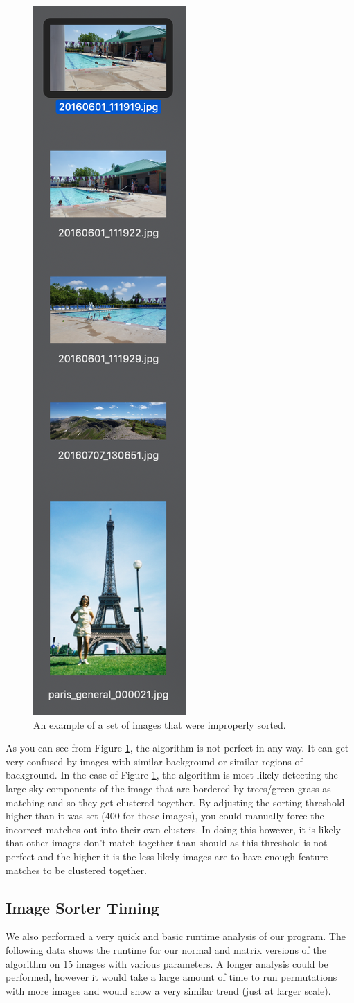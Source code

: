 \documentclass[12pt]{article}
\begin{document}
\begin{figure}[H]
	\centering
	\includegraphics[width=.2\textwidth]{images/wrong_match_1.png}
	\caption{An example of a set of images that were improperly sorted.}
	\label{fig:incorrect_sort}
\end{figure}

	As you can see from Figure \ref{fig:incorrect_sort}, the algorithm is not perfect in any way. It can get very confused by images with similar background or similar regions of background. In the case of Figure \ref{fig:incorrect_sort}, the algorithm is most likely detecting the large sky components of the image that are bordered by trees/green grass as matching and so they get clustered together. By adjusting the sorting threshold higher than it was set (400 for these images), you could manually force the incorrect matches out into their own clusters. In doing this however, it is likely that other images don't match together than should as this threshold is not perfect and the higher it is the less likely images are to have enough feature matches to be clustered together.

\subsection{Image Sorter Timing}
	We also performed a very quick and basic runtime analysis of our program. The following data shows the runtime for our normal and matrix versions of the algorithm on 15 images with various parameters. A longer analysis could be performed, however it would take a large amount of time to run permutations with more images and would show a very similar trend (just at larger scale).
	
\end{document}
